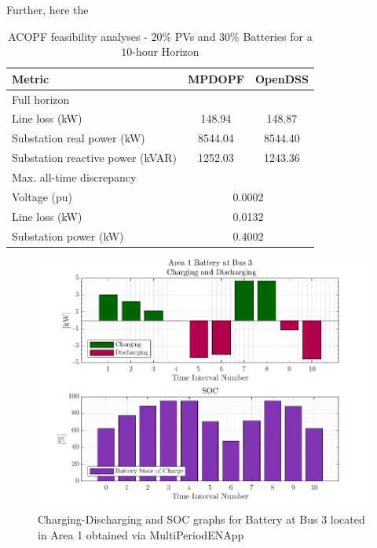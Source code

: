 \documentclass[../../outputs/main.tex]{subfiles}
\begin{document}
Further, here the 

\begin{table}[h!]
    \centering
    \caption{ACOPF feasibility analyses - $20 \%$ PVs and $30 \%$ Batteries for a $10$-hour Horizon}
    \begin{tabular}{|l|c|c|}
    \hline
    \textbf{Metric} & \textbf{MPDOPF} & \textbf{OpenDSS} \\ \hline
    Full horizon  & \multicolumn{2}{c|}{} \\ \hline
    \quad Line loss (kW) & 148.94 & 148.87 \\ \hline
    \quad Substation real power (kW) & 8544.04 & 8544.40 \\ \hline
    \quad Substation reactive power (kVAR) & 1252.03 & 1243.36 \\ \hline
    Max. all-time discrepancy & \multicolumn{2}{c|}{} \\ \hline
    \quad Voltage (pu) & \multicolumn{2}{c|}{0.0002} \\ \hline
    \quad Line loss (kW) & \multicolumn{2}{c|}{0.0132} \\ \hline
    \quad Substation power (kW) & \multicolumn{2}{c|}{0.4002} \\ \hline
    \end{tabular}
    \label{table:feas-copf-10-20-30}
\end{table}

\begin{figure}[h!]
    \centering
    \includegraphics[width=\linewidth]{../figures/T10-pv20-batt30-genCost/dopf/BatteryPlots/macroItr_5_genCost_Battery_1_alpha_0.001.png}
    \caption{Charging-Discharging and SOC graphs for Battery at Bus 3 located in Area 1 obtained via MultiPeriodENApp}
    \label{fig:batt-plot-dopf-5-20-30-genCost}
\end{figure}
\end{document}
